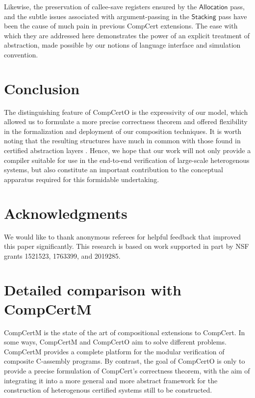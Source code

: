 \documentclass[sigplan,10pt,review]{acmart}
\newcommand{\kw}[1]{\ensuremath{ \mathsf{#1} }}
\begin{document}
Likewise, the preservation of callee-save registers
ensured by the \kw{Allocation} pass,
and the subtle issues associated with argument-passing
in the \kw{Stacking} pass
have been the cause of much pain
in previous CompCert extensions.
The ease with which they are addressed here
demonstrates the power of
an explicit treatment of abstraction,
made possible
by our notions of language interface and simulation convention.


\section{Conclusion} \label{sec:concl} %

The distinguishing feature of CompCertO
is the expressivity of our model,
which allowed us to formulate a more precise correctness theorem
and offered flexibility
in the formalization and deployment of
our composition techniques.
It is worth noting that
the resulting structures have much in common with
those found in
certified abstraction layers \cite{popl15,rbgs-cal}.
Hence,
we hope that our work will not only
provide a compiler
suitable for use in the end-to-end verification of
large-scale heterogenous systems,
but also constitute an important contribution
to the conceptual apparatus
required for this formidable undertaking.


\section*{Acknowledgments} %
We would like to thank anonymous referees for helpful feedback that
improved this paper significantly.  This research is based on work
supported in part by NSF grants 1521523, 1763399, and 2019285.


\balance



\clearpage
\appendix
\nobalance

\section{Detailed comparison with CompCertM} %

CompCertM is the state of the art
of compositional extensions to CompCert.
In some ways,
CompCertM and CompCertO aim to solve different problems.
CompCertM provides a complete platform
for the modular verification of composite C-assembly programs.
By contrast,
the goal of CompCertO is only to
provide a precise formulation of CompCert's correctness theorem,
with the aim of integrating it into
a more general and more abstract framework
for the construction of heterogenous certified systems
still to be constructed.
\end{document}
